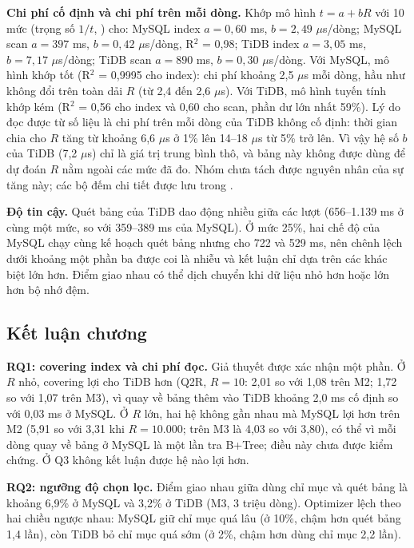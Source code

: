 \textbf{Chi phí cố định và chi phí trên mỗi dòng.} Khớp mô hình $t = a + bR$ với 10 mức (trọng số $1/t$, ) cho: MySQL index $a = 0{,}60$ ms, $b = 2{,}49$ $\mu$s/dòng; MySQL scan $a = 397$ ms, $b = 0{,}42$ $\mu$s/dòng, R$^2$ = 0,98; TiDB index $a = 3{,}05$ ms, $b = 7{,}17$ $\mu$s/dòng; TiDB scan $a = 890$ ms, $b = 0{,}30$ $\mu$s/dòng. Với MySQL, mô hình khớp tốt (R$^2$ = 0,9995 cho index): chi phí khoảng 2,5 $\mu$s mỗi dòng, hầu như không đổi trên toàn dải $R$ (từ 2,4 đến 2,6 $\mu$s). Với TiDB, mô hình tuyến tính khớp kém (R$^2$ = 0,56 cho index và 0,60 cho scan, phần dư lớn nhất 59\%). Lý do đọc được từ số liệu là chi phí trên mỗi dòng của TiDB không cố định: thời gian chia cho $R$ tăng từ khoảng 6,6 $\mu$s ở 1\% lên 14--18 $\mu$s từ 5\% trở lên. Vì vậy hệ số $b$ của TiDB (7,2 $\mu$s) chỉ là giá trị trung bình thô, và bảng này không được dùng để dự đoán $R$ nằm ngoài các mức đã đo. Nhóm chưa tách được nguyên nhân của sự tăng này; các bộ đếm chi tiết được lưu trong .


\textbf{Độ tin cậy.} Quét bảng của TiDB dao động nhiều giữa các lượt (656--1.139 ms ở cùng một mức, so với 359--389 ms của MySQL). Ở mức 25\%, hai chế độ của MySQL chạy cùng kế hoạch quét bảng nhưng cho 722 và 529 ms, nên chênh lệch dưới khoảng một phần ba được coi là nhiễu và kết luận chỉ dựa trên các khác biệt lớn hơn. Điểm giao nhau có thể dịch chuyển khi dữ liệu nhỏ hơn hoặc lớn hơn bộ nhớ đệm.

\subsection{Kết luận chương}
\textbf{RQ1: covering index và chi phí đọc.} Giả thuyết được xác nhận một phần. Ở $R$ nhỏ, covering lợi cho TiDB hơn (Q2R, $R = 10$: 2,01 so với 1,08 trên M2; 1,72 so với 1,07 trên M3), vì quay về bảng thêm vào TiDB khoảng 2,0 ms cố định so với 0,03 ms ở MySQL. Ở $R$ lớn, hai hệ không gần nhau mà MySQL lợi hơn trên M2 (5,91 so với 3,31 khi $R = 10.000$; trên M3 là 4,03 so với 3,80), có thể vì mỗi dòng quay về bảng ở MySQL là một lần tra B+Tree; điều này chưa được kiểm chứng. Ở Q3 không kết luận được hệ nào lợi hơn.

\textbf{RQ2: ngưỡng độ chọn lọc.} Điểm giao nhau giữa dùng chỉ mục và quét bảng là khoảng 6,9\% ở MySQL và 3,2\% ở TiDB (M3, 3 triệu dòng). Optimizer lệch theo hai chiều ngược nhau: MySQL giữ chỉ mục quá lâu (ở 10\%, chậm hơn quét bảng 1,4 lần), còn TiDB bỏ chỉ mục quá sớm (ở 2\%, chậm hơn dùng chỉ mục 2,2 lần).

